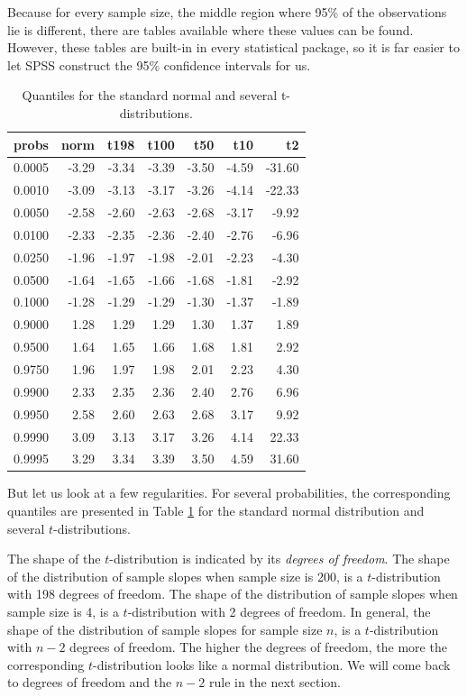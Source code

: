 \documentclass[]{report}\usepackage[]{graphicx}\usepackage[]{color}
\begin{document}
Because for every sample size, the middle region where 95\% of the observations lie is different, there are tables available where these values can be found. However, these tables are built-in in every statistical package, so it is far easier to let SPSS construct the 95\% confidence intervals for us.


\begin{table}[ht]
\centering
\caption{Quantiles for the standard normal and several t-distributions.} 
\label{tab:table_1}
\begin{tabular}{rrrrrrr}
  \hline
probs & norm & t198 & t100 & t50 & t10 & t2 \\ 
  \hline
0.0005 & -3.29 & -3.34 & -3.39 & -3.50 & -4.59 & -31.60 \\ 
  0.0010 & -3.09 & -3.13 & -3.17 & -3.26 & -4.14 & -22.33 \\ 
  0.0050 & -2.58 & -2.60 & -2.63 & -2.68 & -3.17 & -9.92 \\ 
  0.0100 & -2.33 & -2.35 & -2.36 & -2.40 & -2.76 & -6.96 \\ 
  0.0250 & -1.96 & -1.97 & -1.98 & -2.01 & -2.23 & -4.30 \\ 
  0.0500 & -1.64 & -1.65 & -1.66 & -1.68 & -1.81 & -2.92 \\ 
  0.1000 & -1.28 & -1.29 & -1.29 & -1.30 & -1.37 & -1.89 \\ 
  0.9000 & 1.28 & 1.29 & 1.29 & 1.30 & 1.37 & 1.89 \\ 
  0.9500 & 1.64 & 1.65 & 1.66 & 1.68 & 1.81 & 2.92 \\ 
  0.9750 & 1.96 & 1.97 & 1.98 & 2.01 & 2.23 & 4.30 \\ 
  0.9900 & 2.33 & 2.35 & 2.36 & 2.40 & 2.76 & 6.96 \\ 
  0.9950 & 2.58 & 2.60 & 2.63 & 2.68 & 3.17 & 9.92 \\ 
  0.9990 & 3.09 & 3.13 & 3.17 & 3.26 & 4.14 & 22.33 \\ 
  0.9995 & 3.29 & 3.34 & 3.39 & 3.50 & 4.59 & 31.60 \\ 
   \hline
\end{tabular}
\end{table}

But let us look at a few regularities. For several probabilities, the corresponding quantiles are presented in Table \ref{tab:table_1} for the standard normal distribution and several $t$-distributions.

The shape of the $t$-distribution is indicated by its \textit{degrees of freedom}. The shape of the distribution of sample slopes when sample size is 200, is a $t$-distribution with 198 degrees of freedom. The shape of the distribution of sample slopes when sample size is 4, is a $t$-distribution with 2 degrees of freedom. In general, the shape of the distribution of sample slopes for sample size $n$, is a $t$-distribution with $n-2$ degrees of freedom. The higher the degrees of freedom, the more the corresponding $t$-distribution looks like a normal distribution. We will come back to degrees of freedom and the $n-2$ rule in the next section.
\end{document}
